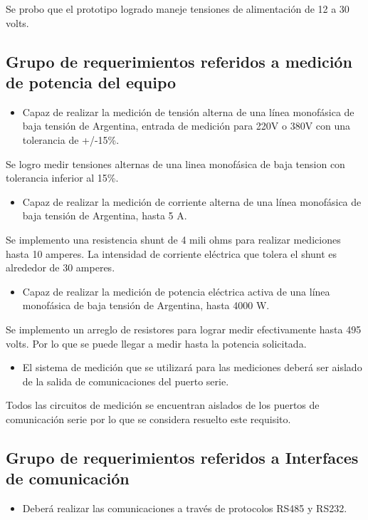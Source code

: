 Se probo que el prototipo logrado maneje tensiones de alimentación de 12 a 30 volts.

\subsection{Grupo de requerimientos referidos a medición de potencia del equipo}
\begin{itemize}
\item Capaz de realizar la medición de tensión alterna de una línea monofásica de baja tensión de Argentina, entrada de medición para 220V o 380V con una tolerancia de +/-15\%.
\end{itemize}

Se logro medir tensiones alternas de una linea monofásica de baja tension con tolerancia inferior al 15\%.

\begin{itemize}
\item Capaz de realizar la medición de corriente alterna de una línea monofásica de baja tensión de Argentina, hasta 5 A.
\end{itemize}

Se implemento una resistencia shunt de 4 mili ohms para realizar mediciones hasta 10 amperes. La intensidad de corriente eléctrica que tolera el shunt es alrededor de 30 amperes.

\begin{itemize}
\item Capaz de realizar la medición de potencia eléctrica activa de una línea monofásica de baja tensión de Argentina, hasta 4000 W.
\end{itemize}

Se implemento un arreglo de resistores para lograr medir efectivamente hasta 495 volts. Por lo que se puede llegar a medir hasta la potencia solicitada.

\begin{itemize}
\item El sistema de medición que se utilizará para las mediciones deberá ser aislado de la salida de comunicaciones del puerto serie.
\end{itemize}

Todos las circuitos de medición se encuentran aislados de los puertos de comunicación serie por lo que se considera resuelto este requisito.

\subsection{Grupo de requerimientos referidos a Interfaces de comunicación}
\begin{itemize}
\item Deberá realizar las comunicaciones a través de protocolos RS485 y RS232.
\end{itemize}

